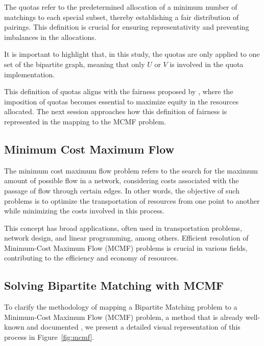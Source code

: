             The quotas refer to the predetermined allocation of a minimum number of matchings to each special subset, thereby establishing a fair distribution of pairings. This definition is crucial for ensuring representativity and preventing imbalances in the allocations.
            
            It is important to highlight that, in this study, the quotas are only applied to one set of the bipartite graph, meaning that only $U$ or $V$ is involved in the quota implementation.
            
            This definition of quotas aligns with the fairness proposed by \cite{sankar}, where the imposition of quotas becomes essential to maximize equity in the resources allocated. The next session approaches how this definition of fairness is represented in the mapping to the MCMF problem. 
            
            \subsection{Minimum Cost Maximum Flow}
            
            The minimum cost maximum flow problem refers to the search for the maximum amount of possible flow in a network, considering costs associated with the passage of flow through certain edges. In other words, the objective of such problems is to optimize the transportation of resources from one point to another while minimizing the costs involved in this process.
            
            This concept has broad applications, often used in transportation problems, network design, and linear programming, among others. Efficient resolution of Minimum-Cost Maximum Flow (MCMF) problems is crucial in various fields, contributing to the efficiency and economy of resources.
            
            \subsection{Solving Bipartite Matching with MCMF}\label{subsubsec:resolucao-fluxo-matching}
            
            To clarify the methodology of mapping a Bipartite Matching problem to a Minimum-Cost Maximum Flow (MCMF) problem, a method that is already well-known and documented \cite{ahuja1993network, edmonds1972theoretical, tarjan1997dynamic}, we present a detailed visual representation of this process in Figure~\ref{fig:mcmf}.
            

